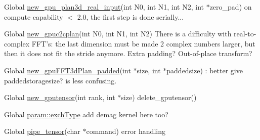 \begin{DoxyDescription}
\item[Global \hyperlink{gpufft_8h_adaab760b0595a368b478605477bb9e2d}{new\_\-gpu\_\-plan3d\_\-real\_\-input}(int N0, int N1, int N2, int $\ast$zero\_\-pad) ]on compute capability $<$ 2.0, the first step is done serially... 
\end{DoxyDescription}

\label{todo__todo000001}
\hypertarget{todo__todo000001}{}
 
\begin{DoxyDescription}
\item[Global \hyperlink{gpuconv1_8h_a7f9fff8937542904f3822c36dc968519}{new\_\-gpuc2cplan}(int N0, int N1, int N2) ]There is a difficulty with real-\/to-\/complex FFT's: the last dimension must be made 2 complex numbers larger, but then it does not fit the stride anymore. Extra padding? Out-\/of-\/place transform? 
\end{DoxyDescription}

\label{todo__todo000014}
\hypertarget{todo__todo000014}{}
 
\begin{DoxyDescription}
\item[Global \hyperlink{gpufft2_8h_a56fef026d295e4997387d2a5003280bf}{new\_\-gpuFFT3dPlan\_\-padded}(int $\ast$size, int $\ast$paddedsize) ]: better give paddedstoragesize? is less confusing. 
\end{DoxyDescription}

\label{todo__todo000017}
\hypertarget{todo__todo000017}{}
 
\begin{DoxyDescription}
\item[Global \hyperlink{gputil_8h_a7c2b7f29fd636e841b2001b07ffb5d18}{new\_\-gputensor}(int rank, int $\ast$size) ]delete\_\-gputensor() 
\end{DoxyDescription}

\label{todo__todo000021}
\hypertarget{todo__todo000021}{}
 
\begin{DoxyDescription}
\item[Global \hyperlink{structparam_a7274904db5b3421e22e323af7d1d7563}{param::exchType} ]add demag kernel here too? 
\end{DoxyDescription}

\label{todo__todo000022}
\hypertarget{todo__todo000022}{}
 
\begin{DoxyDescription}
\item[Global \hyperlink{pipes_8h_a03c86bf04106660fa2a7592726f07c19}{pipe\_\-tensor}(char $\ast$command) ]error handling 
\end{DoxyDescription}

